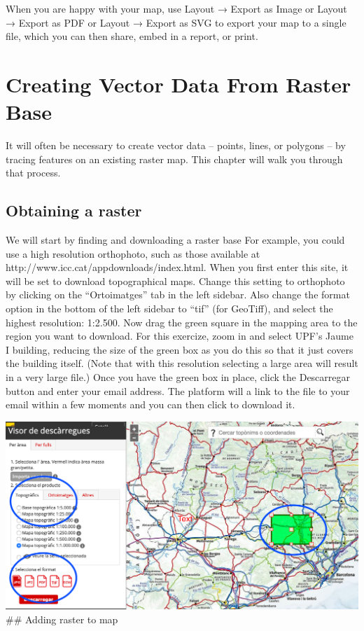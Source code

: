 \documentclass[]{book}
\begin{document}
When you are happy with your map, use Layout → Export as Image or Layout → Export as PDF or Layout → Export as SVG to export your map to a single file, which you can then share, embed in a report, or print.

\hypertarget{vector-from-raster}{%
\chapter{Creating Vector Data From Raster Base}\label{vector-from-raster}}

It will often be necessary to create vector data -- points, lines, or polygons -- by tracing features on an existing raster map. This chapter will walk you through that process.

\hypertarget{obtaining-a-raster}{%
\section{Obtaining a raster}\label{obtaining-a-raster}}

We will start by finding and downloading a raster base For example, you could use a high resolution orthophoto, such as those available at http://www.icc.cat/appdownloads/index.html. When you first enter this site, it will be set to download topographical maps. Change this setting to orthophoto by clicking on the ``Ortoimatges'' tab in the left sidebar. Also change the format option in the bottom of the left sidebar to ``tif'' (for GeoTiff), and select the highest resolution: 1:2.500. Now drag the green square in the mapping area to the region you want to download. For this exercize, zoom in and select UPF's Jaume I building, reducing the size of the green box as you do this so that it just covers the building itself. (Note that with this resolution selecting a large area will result in a very large file.) Once you have the green box in place, click the Descarregar button and enter your email address. The platform will a link to the file to your email within a few moments and you can then click to download it.

\includegraphics{images/icc_map.png}
\#\# Adding raster to map
\end{document}
